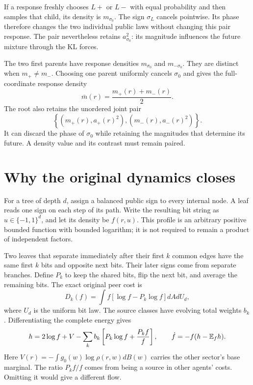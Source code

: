 If a response freshly chooses $L+$ or $L-$ with equal probability and then samples that child, its density is $m_{\sigma_0}$. The sign $\sigma_L$ cancels pointwise. Its phase therefore changes the two individual public laws without changing this pair response. The pair nevertheless retains $a_{\sigma_0}^2$: its magnitude influences the future mixture through the KL forces.

The two first parents have response densities $m_{\sigma_0}$ and $m_{-\sigma_0}$. They are distinct when $m_+\ne m_-$. Choosing one parent uniformly cancels $\sigma_0$ and gives the full-coordinate response density
\begin{equation}
 \bar m(r)=\frac{m_+(r)+m_-(r)}2.
\end{equation}
The root also retains the unordered joint pair
\begin{equation}
 \left\{(m_+(r),a_+(r)^2),(m_-(r),a_-(r)^2)\right\}.
\end{equation}
It can discard the phase of $\sigma_0$ while retaining the magnitudes that determine its future. A density value and its contrast must remain paired.

\section{Why the original dynamics closes}

For a tree of depth $d$, assign a balanced public sign to every internal node. A leaf reads one sign on each step of its path. Write the resulting bit string as $u\in\{-1,1\}^d$, and let its density be $f(r,u)$. This profile is an arbitrary positive bounded function with bounded logarithm; it is not required to remain a product of independent factors.

Two leaves that separate immediately after their first $k$ common edges have the same first $k$ bits and opposite next bits. Their later signs come from separate branches. Define $P_k$ to keep the shared bits, flip the next bit, and average the remaining bits. The exact original peer cost is
\begin{equation}
 D_k(f)=\int f[\log f-P_k\log f]dA dU_d,
\end{equation}
where $U_d$ is the uniform bit law. The source classes have evolving total weights $b_k$. Differentiating the complete energy gives
\begin{equation}
 h=2\log f+V-\sum_k b_k\left[P_k\log f+\frac{P_kf}{f}\right],
 \qquad \dot f=-f(h-\mathbb E_fh).
 \label{comp:boundary-force}
\end{equation}
Here $V(r)=-\int g_0(w)\log\rho(r,w)dB(w)$ carries the other sector's base marginal. The ratio $P_kf/f$ comes from being a source in other agents' costs. Omitting it would give a different flow.

